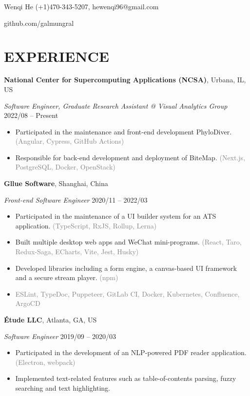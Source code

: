\documentclass[10pt]{article}
\begin{document}
{\huge Wenqi He} \hfill (+1)470-343-5207, hewenqi96@gmail.com

\hfill github.com/galmungral

\section*{EXPERIENCE}
\textbf{National Center for Supercomputing Applications (NCSA)}, Urbana, IL, US

\textit{Software Engineer, Graduate Research Assistant @ Visual Analytics Group} \hfill 2022/08 -- Present

\begin{itemize}[itemsep=0pt, topsep=4pt, label=-]
\item Participated in the maintenance and front-end development PhyloDiver. \textcolor{gray}{(Angular, Cypress, GitHub Actions)}
\item Responsible for back-end development and deployment of BiteMap. \textcolor{gray}{(Next.js, PostgreSQL, Docker, OpenStack)}
\end{itemize}

\vspace{0.5em}
\textbf{Gllue Software}, Shanghai, China

\textit{Front-end Software Engineer}  \hfill 2020/11 -- 2022/03

\begin{itemize}[itemsep=0pt, topsep=4pt, label=-]
\item Participated in the maintenance of a UI builder system for an ATS application. \textcolor{gray}{(TypeScript, RxJS, Rollup, Lerna)}
\item Built multiple desktop web apps and WeChat mini-programs. \textcolor{gray}{(React, Taro, Redux-Saga, ECharts, Vite, Jest, Husky)}
\item Developed libraries including a form engine, a canvas-based UI framework and a secure stream player. \textcolor{gray}{(npm)}
\item \textcolor{gray}{ESLint, TypeDoc, Puppeteer, GitLab CI, Docker, Kubernetes, Confluence, ArgoCD}
\end{itemize}
\vspace{0.5em}
\textbf{Étude LLC}, Atlanta, GA, US

\textit{Software Engineer} \hfill 2019/09 -- 2020/03

\begin{itemize}[itemsep=0pt, topsep=4pt, label=-]
\item Participated in the development of an NLP-powered PDF reader application. \textcolor{gray}{(Electron, webpack)}
\item Implemented text-related features such as table-of-contents parsing, fuzzy searching and text highlighting.
\end{itemize}
\end{document}
